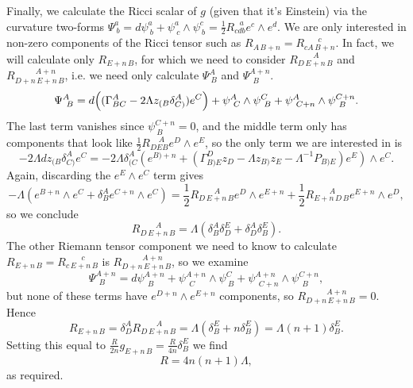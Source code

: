 Finally, we calculate the Ricci scalar of $g$ (given that it's Einstein)
via the curvature two-forms $\Psi_{\ b}^{a}={d}\psi_{\ b}^{a}+\psi_{\ c}^{a}\wedge\psi_{\ b}^{c}=\frac{1}{2}R_{cdb}^{\ \ \ a}e^{c}\wedge e^{d}$.
We are only interested in non-zero components of the Ricci tensor
such as $R_{A\, B+n}=R_{cA\, B+n}^{\ \ \ \ \ \ \ \ c}$. In fact, we will
calculate only $R_{E+n\, B}$, for which we need to consider $R_{D\, E+n\, B}^{\ \ \ \ \ \ \ \ \ A}$
and $R_{D+n\, E+n\, B}^{\ \ \ \ \ \ \ \ \ \ \ \ A+n}$, i.e. we need only calculate
$\Psi_{\ B}^{A}$ and $\Psi_{\ \ B}^{A+n}$. 
\[
\Psi_{\ B}^{A}={d}\Bigl((\Gamma_{BC}^{A}-2\Lambda z_{(B}\delta_{C)}^{A})e^{C}\Bigr)+\psi_{\ C}^{A}\wedge\psi_{\ B}^{C}+\psi_{\ C+n}^{A}\wedge\psi_{\ B}^{C+n}.
\]
The last term vanishes since $\psi_{\ B}^{C+n}=0$, and the middle
term only has components that look like $\frac{1}{2}R_{DEB}^{\ \ \ \ \ A}e^{D}\wedge e^{E}$,
so the only term we are interested in is 
\[
-2\Lambda{d}z_{(B}\delta_{C)}^{A}e^{C}=-2\Lambda\delta_{(C}^{A}(e^{B)+n}+(\Gamma_{B)E}^{D}z_{D}-\Lambda z_{B)}z_{E}-\Lambda^{-1}P_{B)E})e^{E})\wedge e^{C}.
\]
Again, discarding the $e^{E}\wedge e^{C}$ term gives
\[
-\Lambda(e^{B+n}\wedge e^{C}+\delta_{B}^{A}e^{C+n}\wedge e^{C})=\frac{1}{2}R_{D\, E+n\, B}^{\ \ \ \ \ \ \ \ \ A}e^{D}\wedge e^{E+n}+\frac{1}{2}R_{E+n\, D\, B}^{\ \ \ \ \ \ \ \ \ A}e^{E+n}\wedge e^{D},
\]
so we conclude
\[
R_{D\, E+n\, B}^{\ \ \ \ \ \ \ \ \ A}=\Lambda(\delta_{B}^{A}\delta_{D}^{E}+\delta_{D}^{A}\delta_{B}^{E}).
\]
The other Riemann tensor component we need to know to calculate $R_{E+n\, B}=R_{c\, E+n\, B}^{\ \ \ \ \ \ \ \ \ c}$
is $R_{D+n\, E+n\, B}^{\ \ \ \ \ \ \ \ \ \ \ \ A+n}$, so we examine
\[
\Psi_{\ \ B}^{A+n}={d}\psi_{\ \ B}^{A+n}+\psi_{\ \ C}^{A+n}\wedge\psi_{\ B}^{C}+\psi_{\ \ C+n}^{A+n}\wedge\psi_{\ \ B}^{C+n},
\]
but none of these terms have $e^{D+n}\wedge e^{E+n}$ components,
so $R_{D+n\, E+n\, B}^{\ \ \ \ \ \ \ \ \ \ \ \ A+n}=0$. Hence 
\[
R_{E+n\, B}=\delta_{D}^{A}R_{D\, E+n\, B}^{\ \ \ \ \ \ \ \ \  A}=\Lambda(\delta_{B}^{E}+n\delta_{B}^{E})=\Lambda(n+1)\delta_{B}^{E}.
\]
Setting this equal to $\frac{R}{2n}g_{E+n\, B}=\frac{R}{4n}\delta_{B}^{E}$
we find 
\[
R=4n(n+1)\Lambda,
\]
as required.